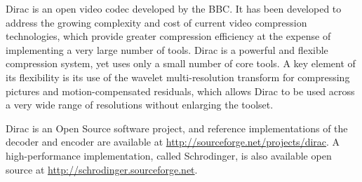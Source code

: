 Dirac is an open video codec developed by the BBC. It has been 
developed to address the growing complexity and cost of current video
compression technologies, which provide greater compression efficiency
at the expense of implementing a very large number of tools. Dirac is
a powerful and flexible compression system, yet uses only a small number
of core tools. A key element of its flexibility is its use of the wavelet
multi-resolution transform for compressing pictures and motion-compensated 
residuals, which allows Dirac to be used across a very wide range of resolutions
without enlarging the toolset.

Dirac is an Open Source software project, and reference implementations
of the decoder and encoder are available at \url{http://sourceforge.net/projects/dirac}.
A high-performance implementation, called Schrodinger, is also available
open source at \url{http://schrodinger.sourceforge.net}.

